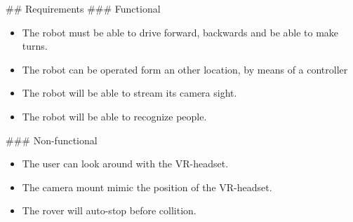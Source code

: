 \documentclass[12pt,twoside]{article}
\begin{document}
\begin{markdown}
\newpage
## Requirements
### Functional
\begin{itemize}
  \item The robot must be able to drive forward, backwards and be able to make turns.
  \item The robot can be operated form an other location, by means of a controller
  \item The robot will be able to stream its camera sight.
  \item The robot will be able to recognize people.
\end{itemize}
    
### Non-functional
\begin{itemize}
    \item The user can look around with the VR-headset.
    \item The camera mount mimic the position of the VR-headset.
    \item The rover will auto-stop before collition.
\end{itemize}

\end{markdown}
\end{document}
